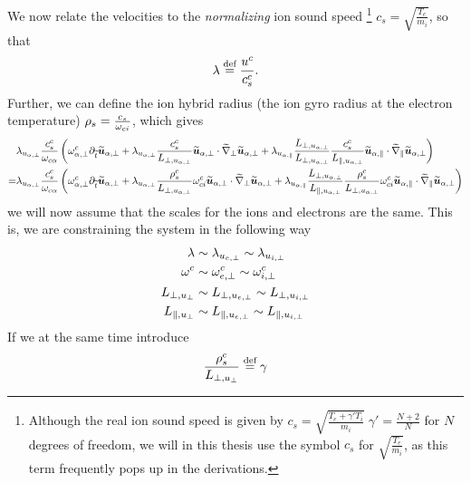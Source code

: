 %
We now relate the velocities to the \emph{normalizing} ion sound speed%
%
\footnote{Although the real ion sound speed is given by $c_s=\sqrt{\frac{T_e+\gamma' T_i}{m_i}}\;\gamma'=\frac{N+2}{N}$ for $N$ degrees of freedom, we will in this thesis use the symbol $c_s$ for $\sqrt{\frac{T_e}{m_i}}$, as this term frequently pops up in the derivations.}
%
$c_s = \sqrt{\frac{T_e}{m_i}}$, so that
%
\begin{align*}
    \lambda \overset{\text{def}}{=} \frac{u^c}{c^c_s}.
\end{align*}
%
Further, we can define the ion hybrid radius (the ion gyro radius at the electron temperature) $\rho_s=\frac{c_s}{\omega_{ci}}$, which gives
%
\begin{align*}
    &
 \lambda_{u_{\alpha,\perp}}
 \frac{c^c_s}{\omega_{c\alpha}}
 \left(
 \omega^c_{\alpha,\perp}
 \partial_{\widetilde{ t}} \widetilde{ \boldsymbol{u}}_{\alpha,\perp}
 +
 \lambda_{u_{\alpha,\perp}}
 \frac{ c^c_s }{L_{\perp, u_{\alpha,\perp}}}
 \widetilde{ \boldsymbol{u}}_{\alpha,\perp}\cdot\widetilde{ \nabla}_\perp\widetilde{ \boldsymbol{u}}_{\alpha,\perp}
 +
 \lambda_{u_{\alpha,\|}}
 \frac{L_{\perp, u_{\alpha,\perp}}}{L_{\perp, u_{\alpha,\perp}}}
 \frac{c^c_s}{L_{\|, u_{\alpha,\perp}}}
 \widetilde{ \boldsymbol{u}}_{\alpha,\|}\cdot\widetilde{ \nabla}_\|\widetilde{ \boldsymbol{u}}_{\alpha,\perp}
 \right)
 \\
 =&
 \lambda_{u_{\alpha,\perp}}
 \frac{c^c_s}{\omega_{c\alpha}}
 \left(
 \omega^c_{\alpha,\perp}
 \partial_{\widetilde{ t}} \widetilde{ \boldsymbol{u}}_{\alpha,\perp}
 +
 \lambda_{u_{\alpha,\perp}}
 \frac{ \rho^c_s }{L_{\perp, u_{\alpha,\perp}}}
 \omega^c_{ci}
 \widetilde{ \boldsymbol{u}}_{\alpha,\perp}\cdot\widetilde{ \nabla}_\perp\widetilde{ \boldsymbol{u}}_{\alpha,\perp}
 +
 \lambda_{u_{\alpha,\|}}
 \frac{L_{\perp, u_{\alpha,\perp}}}{L_{\|, u_{\alpha,\perp}}}
 \frac{\rho^c_s}{L_{\perp, u_{\alpha,\perp}}}
 \omega^c_{ci}
 \widetilde{ \boldsymbol{u}}_{\alpha,\|}\cdot\widetilde{ \nabla}_\|\widetilde{ \boldsymbol{u}}_{\alpha,\perp}
 \right)
\end{align*}
%
we will now assume that the scales for the ions and electrons are the same.
This is, we are constraining the system in the following way
%
\begin{align*}
    \lambda              &\sim \lambda_{u_{e,\perp}}  \sim \lambda_{u_{i,\perp}} \\
    \omega^c                &\sim \omega^c_{e,\perp}        \sim \omega^c_{i,\perp}       \\
    L_{\perp, u_{\perp}} &\sim L_{\perp, u_{e,\perp}} \sim L_{\perp, u_{i,\perp}}\\
    L_{\|, u_{\perp}}    &\sim L_{\|, u_{e,\perp}}    \sim L_{\|, u_{i,\perp}}
\end{align*}
%
If we at the same time introduce
%
\begin{align*}
    \frac{ \rho^c_s }{L_{\perp, u_{\perp}}} \overset{\text{def}}{=} \gamma
\end{align*}

